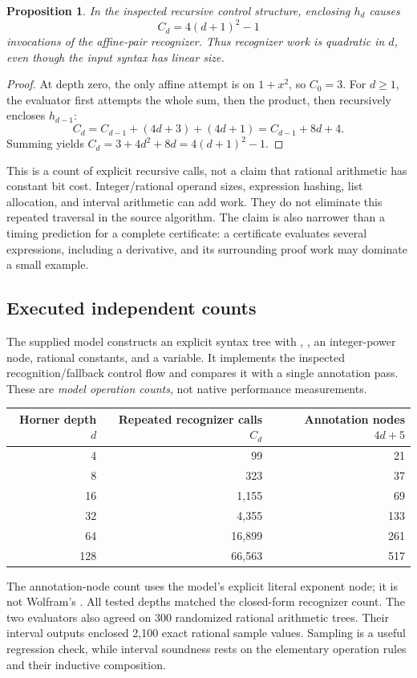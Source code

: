 \documentclass[11pt,a4paper]{article}
\newcommand{\code}[1]{\texttt{\detokenize{#1}}}
\newtheorem{proposition}{Proposition}[section]
\begin{document}
\begin{proposition}\label{prop:quadratic}
In the inspected recursive control structure, enclosing $h_d$ causes
\begin{equation}\label{eq:probe-count}
 C_d=4(d+1)^2-1
\end{equation}
invocations of the affine-pair recognizer. Thus recognizer work is quadratic in
$d$, even though the input syntax has linear size.
\end{proposition}
\begin{proof}
At depth zero, the only affine attempt is on $1+x^2$, so $C_0=3$.
For $d\ge1$, the evaluator first attempts the whole sum, then the product, then
recursively encloses $h_{d-1}$:
\[
 C_d=C_{d-1}+(4d+3)+(4d+1)=C_{d-1}+8d+4.
\]
Summing yields $C_d=3+4d^2+8d=4(d+1)^2-1$.
\end{proof}

This is a count of explicit recursive calls, not a claim that rational arithmetic
has constant bit cost. Integer/rational operand sizes, expression hashing,
list allocation, and interval arithmetic can add work. They do not eliminate
this repeated traversal in the source algorithm. The claim is also narrower
than a timing prediction for a complete certificate: a certificate evaluates
several expressions, including a derivative, and its surrounding proof work may
dominate a small example.

\subsection{Executed independent counts}
The supplied model constructs an explicit syntax tree with \code{Plus},
\code{Times}, an integer-power node, rational constants, and a variable. It
implements the inspected recognition/fallback control flow and compares it
with a single annotation pass. These are \emph{model operation counts}, not
native performance measurements.
\begin{center}
\begin{tabular}{@{}rrr@{}}
\toprule Horner depth $d$ & Repeated recognizer calls $C_d$ & Annotation nodes $4d+5$\\\midrule
4 & 99 & 21\\
8 & 323 & 37\\
16 & 1,155 & 69\\
32 & 4,355 & 133\\
64 & 16,899 & 261\\
128 & 66,563 & 517\\
\bottomrule
\end{tabular}
\end{center}
The annotation-node count uses the model's explicit literal exponent node; it
is not Wolfram's \code{LeafCount}. All tested depths matched the closed-form
recognizer count. The two evaluators also agreed on 300 randomized rational
arithmetic trees. Their interval outputs enclosed 2,100 exact rational sample
values. Sampling is a useful regression check, while interval soundness rests
on the elementary operation rules and their inductive composition.
\end{document}
